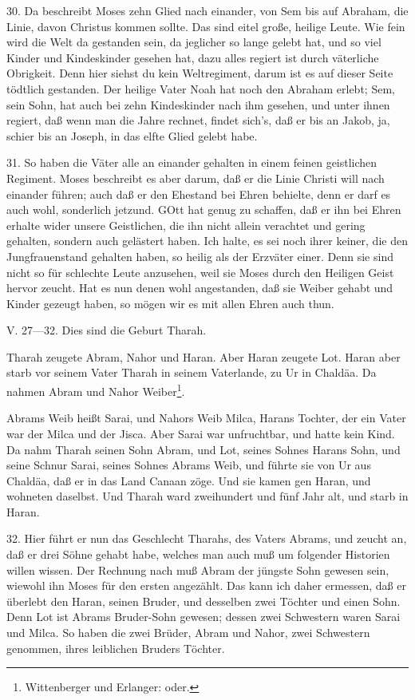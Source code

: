 30. Da beschreibt Moses zehn Glied nach einander, von Sem bis auf Abraham, die Linie, davon Christus kommen sollte. Das sind eitel große, heilige Leute. Wie fein wird die Welt da gestanden sein, da jeglicher so lange gelebt hat, und so viel Kinder und Kindeskinder gesehen hat, dazu alles regiert ist durch väterliche Obrigkeit. Denn hier siehst du kein Weltregiment, darum ist es auf dieser Seite tödtlich gestanden. Der heilige Vater Noah hat noch den Abraham erlebt; Sem, sein Sohn, hat auch bei zehn Kindeskinder nach ihm gesehen, und unter ihnen regiert, daß wenn man die Jahre rechnet, findet sich’s, daß er bis an Jakob, ja, schier bis an Joseph, in das elfte Glied gelebt habe.

31. So haben die Väter alle an einander gehalten in einem feinen geistlichen Regiment. Moses beschreibt es aber darum, daß er die Linie Christi will nach einander führen; auch daß er den Ehestand bei Ehren behielte, denn er darf es auch wohl, sonderlich jetzund. GOtt hat genug zu schaffen, daß er ihn bei Ehren erhalte wider unsere Geistlichen, die ihn nicht allein verachtet und gering gehalten, sondern auch gelästert haben. Ich halte, es sei noch ihrer keiner, die den Jungfrauenstand gehalten haben, so heilig als der Erzväter einer. Denn sie sind nicht so für schlechte Leute anzusehen, weil sie Moses durch den Heiligen Geist hervor zeucht. Hat es nun denen wohl angestanden, daß sie Weiber gehabt und Kinder gezeugt haben, so mögen wir es mit allen Ehren auch thun.

\begin{schriftzitat}
V. 27—32. Dies sind die Geburt Tharah.

Tharah zeugete Abram, Nahor und Haran. Aber Haran zeugete Lot. Haran aber starb vor seinem Vater Tharah in seinem Vaterlande, zu Ur in Chaldäa. Da nahmen Abram und Nahor
Weiber\footnote{Wittenberger und Erlanger: oder.}.

Abrams Weib heißt Sarai, und Nahors Weib Milca, Harans Tochter, der ein Vater war der Milca und der Jisca. Aber Sarai war unfruchtbar, und hatte kein Kind. Da nahm Tharah seinen Sohn Abram, und Lot, seines Sohnes Harans Sohn, und seine Schnur Sarai, seines Sohnes Abrams Weib, und führte sie von Ur aus Chaldäa, daß er in das Land Canaan zöge. Und sie kamen gen Haran, und wohneten daselbst. Und Tharah ward zweihundert und fünf Jahr alt, und starb in Haran.
\end{schriftzitat}

32. Hier führt er nun das Geschlecht Tharahs, des Vaters Abrams, und zeucht an, daß er drei Söhne gehabt habe, welches man auch muß um folgender Historien willen wissen. Der Rechnung nach muß Abram der jüngste Sohn gewesen sein, wiewohl ihn Moses für den ersten angezählt. Das kann ich daher ermessen, daß er überlebt den Haran, seinen Bruder, und desselben zwei Töchter und einen Sohn. Denn Lot ist Abrams Bruder-Sohn gewesen; dessen zwei Schwestern waren Sarai und Milca. So haben die zwei Brüder, Abram und Nahor, zwei Schwestern genommen, ihres leiblichen Bruders Töchter.

